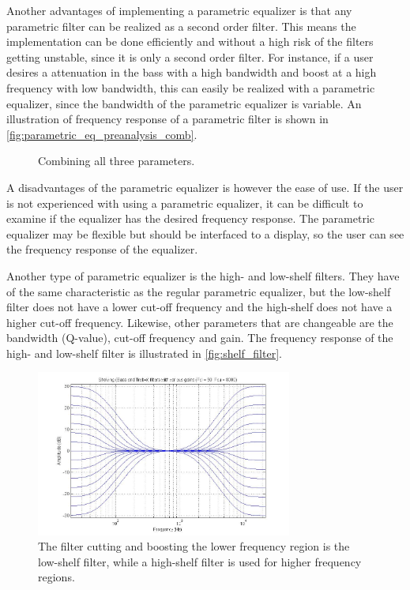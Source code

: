 Another advantages of implementing a parametric equalizer is that any parametric filter can be realized as a second order filter. This means the implementation can be done efficiently and without a high risk of the filters getting unstable, since it is only a second order filter. For instance, if a user desires a attenuation in the bass with a high bandwidth and boost at a high frequency with low bandwidth, this can easily be realized with a parametric equalizer, since the bandwidth of the parametric equalizer is variable. An illustration of frequency response of a parametric filter is shown in \autoref{fig:parametric_eq_preanalysis_comb}.

\begin{figure}[H]
\centering
{}

\caption{Combining all three parameters.}
\label{fig:parametric_eq_preanalysis_comb}
\end{figure}

A disadvantages of the parametric equalizer is however the ease of use. If the user is not experienced with using a parametric equalizer, it can be difficult to examine if the equalizer has the desired frequency response. The parametric equalizer may be flexible but should be interfaced to a display, so the user can see the frequency response of the equalizer.

Another type of parametric equalizer is the high- and low-shelf filters. They have of the same characteristic as the regular parametric equalizer, but the low-shelf filter does not have a lower cut-off frequency and the high-shelf does not have a higher cut-off frequency. Likewise, other parameters that are changeable are the bandwidth (Q-value), cut-off frequency and gain. The frequency response of the high- and low-shelf filter is illustrated in \autoref{fig:shelf_filter}.

\begin{figure}[H]
\centering
\includegraphics[width=0.75\textwidth]{figures/shelf_filter.jpg}
\caption{The filter cutting and boosting the lower frequency region is the low-shelf filter, while a high-shelf filter is used for higher frequency regions.}
\label{fig:shelf_filter}
\end{figure}

